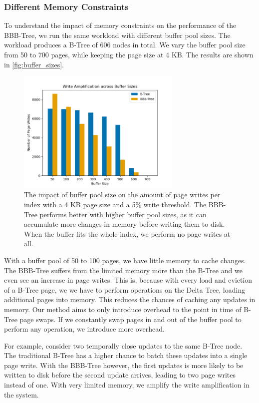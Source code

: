 \subsubsection*{Different Memory Constraints}
To understand the impact of memory constraints on the performance of the BBB-Tree, we run the same workload with different buffer pool sizes.
The workload produces a B-Tree of 606 nodes in total. We vary the buffer pool size from 50 to 700 pages, while keeping the page size at 4 KB.
The results are shown in \autoref{fig:buffer_sizes}.

\begin{figure}[htbp]
  \centering
  \includegraphics[width=0.7\textwidth]{figures/evaluation/pageviews_buffer_sizes.png}
  \caption{The impact of buffer pool size on the amount of page writes per index with a 4 KB page size and a 5\% write threshold. The BBB-Tree performs better with higher buffer pool sizes, as it can accumulate more changes in memory before writing them to disk. When the buffer fits the whole index, we perform no page writes at all.}
  \label{fig:buffer_sizes}
\end{figure}

With a buffer pool of 50 to 100 pages, we have little memory to cache changes.
The BBB-Tree suffers from the limited memory more than the B-Tree and we even see an increase in page writes.
This is, because with every load and eviction of a B-Tree page, we we have to perform operations on the Delta Tree, loading additional pages into memory.
This reduces the chances of caching any updates in memory.
Our method aims to only introduce overhead to the point in time of B-Tree page swaps.
If we constantly swap pages in and out of the buffer pool to perform any operation, we introduce more overhead.

For example, consider two temporally close updates to the same B-Tree node. 
The traditional B-Tree has a higher chance to batch these updates into a single page write.
With the BBB-Tree however, the first updates is more likely to be written to disk before the second update arrives, leading to two page writes instead of one.
With very limited memory, we amplify the write amplification in the system.

